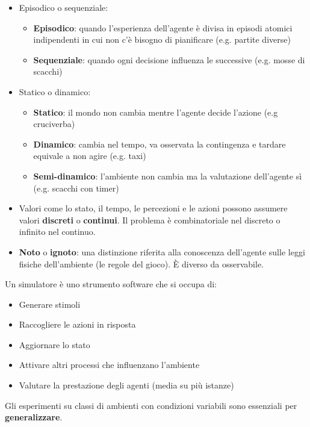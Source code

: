 \begin{itemize}
	\item Episodico o sequenziale:
	\begin{itemize}
		\item \textbf{Episodico}: quando l’esperienza dell’agente è divisa in episodi atomici
		indipendenti in cui non c'è bisogno di pianificare (e.g. partite diverse)
		\item \textbf{Sequenziale}: quando ogni decisione influenza le successive (e.g. mosse di scacchi)
	\end{itemize}
	\item Statico o dinamico:
	\begin{itemize}
		\item \textbf{Statico}: il mondo non cambia mentre l’agente decide l’azione (e.g cruciverba)
		\item \textbf{Dinamico}: cambia nel tempo, va osservata la contingenza e tardare equivale a non agire (e.g. taxi)
		\item \textbf{Semi-dinamico}: l’ambiente non cambia ma la valutazione dell’agente sì (e.g. scacchi con timer)
	\end{itemize}
	\item Valori come lo stato, il tempo, le percezioni e le azioni possono assumere valori \textbf{discreti} o \textbf{continui}. Il problema è combinatoriale nel discreto o infinito nel continuo.
	\item \textbf{Noto} o \textbf{ignoto}: una distinzione riferita alla conoscenza dell'agente sulle leggi fisiche dell'ambiente (le regole del gioco). È diverso da osservabile.
\end{itemize}

\begin{definition}[Simulatore]
	Un simulatore è uno strumento software che si occupa di:
	\begin{itemize}
		\item Generare stimoli
		\item Raccogliere le azioni in risposta
		\item Aggiornare lo stato
		\item Attivare altri processi che influenzano l'ambiente
		\item Valutare la prestazione degli agenti (media su più istanze)
	\end{itemize}
	Gli esperimenti su classi di ambienti con condizioni variabili sono essenziali per \textbf{generalizzare}.
\end{definition}

